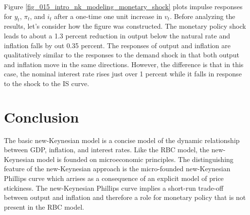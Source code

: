 \documentclass[12pt,fleqn]{article}
\begin{document}
Figure \ref{fig_015_intro_nk_modeling_monetary_shock} plots impulse responses for $y_t$, $\pi_t$, and $i_t$ after a one-time one unit increase in $v_t$. Before analyzing the results, let's consider how the figure was constructed. The monetary policy shock leads to about a 1.3 percent reduction in output below the natural rate and inflation falls by out 0.35 percent. The responses of output and inflation are qualitatively similar to the responses to the demand shock in that both output and inflation move in the same directions. However, the difference is that in this case, the nominal interest rate rises just over 1 percent while it falls in response to the shock to the IS curve.




\section{Conclusion}

The basic new-Keynesian model is a concise model of the dynamic relationship between GDP, inflation, and interest rates. Like the RBC model, the new-Keynesian model is founded on microeconomic principles. The distinguishing feature of the new-Keynesian approach is the micro-founded new-Keynesian Phillips curve which arrises as a consequence of an explicit model of price stickiness. The new-Keynesian Phillips curve implies a short-run trade-off between output and inflation and therefore a role for monetary policy that is not present in the RBC model.
\end{document}
